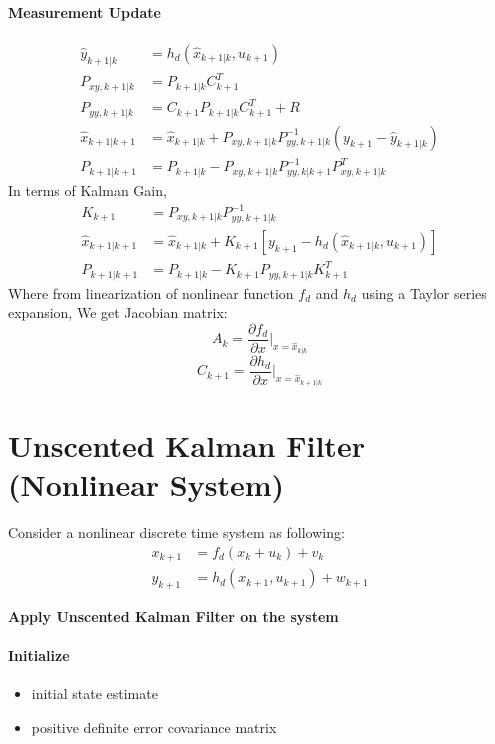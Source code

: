 	\paragraph{Measurement Update}
	\begin{equation}
		\begin{split}
			\hat{y}_{k+1|k} &= h_d(\hat{x}_{k+1|k},u_{k+1})\\
			P_{xy,k+1|k}    &= P_{k+1|k}C^T_{k+1}\\
			P_{yy,k+1|k}    &= C_{k+1}P_{k+1|k}C^T_{k+1}+R\\
			\hat{x}_{k+1|k+1} &= \hat{x}_{k+1|k} + P_{xy,k+1|k}P^{-1}_{yy,k+1|k}(y_{k+1}-\hat{y}_{k+1|k})\\
			P_{k+1|k+1}     &= P_{k+1|k} - P_{xy,k+1|k}P^{-1}_{yy,k|k+1}P^T_{xy,k+1|k} 
		\end{split}
		\label{kfeq7}
	\end{equation}
	In terms of Kalman Gain,
	\begin{equation}
		\begin{split}
			K_{k+1} &= P_{xy,k+1|k}P^{-1}_{yy,k+1|k}\\
			\hat{x}_{k+1|k+1} &= \hat{x}_{k+1|k} + K_{k+1}[y_{k+1} - h_d(\hat{x}_{k+1|k},u_{k+1})] \\
			P_{k+1|k+1} &= P_{k+1|k} - K_{k+1} P_{yy,k+1|k}K^T_{k+1}
		\end{split}
		\label{kfeq8}
	\end{equation}
	Where from linearization of nonlinear function $f_d$ and $h_d$ using a Taylor series expansion, We get Jacobian matrix:
	\[A_k = \frac{\partial f_d}{\partial x}|_{x=\hat{x}_{k|k}}\]
	\[C_{k+1} = \frac{\partial h_d}{\partial x}|_{x=\hat{x}_{k+1|k}}\]
	\section{Unscented Kalman Filter (Nonlinear System)}
	Consider a nonlinear discrete time system as following:
	\begin{equation}
		\begin{split}
			x_{k+1} &= f_d(x_k+u_k) + v_k \\
			y_{k+1} &= h_d(x_{k+1},u_{k+1}) + w_{k+1}
		\end{split}
		\label{kfeq9}
	\end{equation}
	\begin{center}
		\textbf{Apply Unscented Kalman Filter on the system}
	\end{center}
	\paragraph{Initialize}
	\begin{itemize}
		\item { initial state estimate}
		\item { positive definite error covariance matrix}
	\end{itemize}
